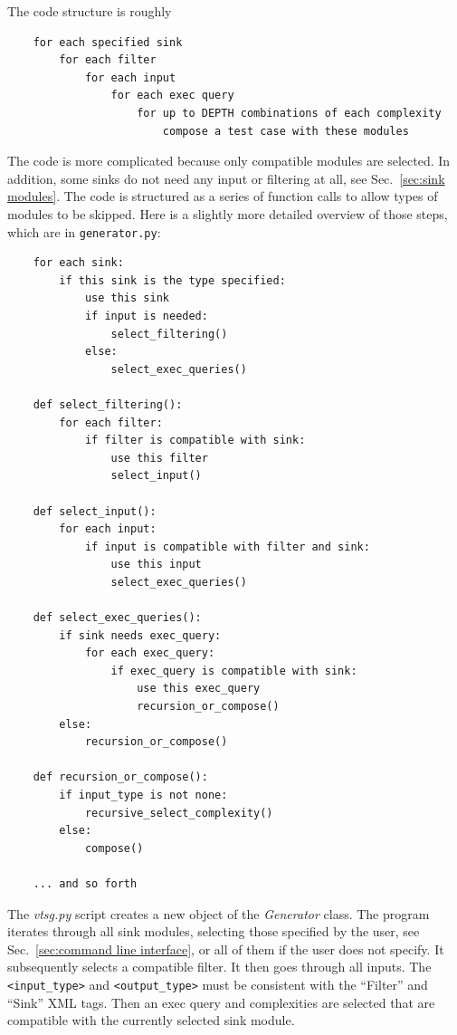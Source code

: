 \documentclass[12pt]{article}
\begin{document}
The code structure is roughly
\begin{verbatim}
    for each specified sink
        for each filter
            for each input
                for each exec query
                    for up to DEPTH combinations of each complexity
                        compose a test case with these modules
\end{verbatim}
The code is more complicated because only compatible modules are 
selected.
In addition, some sinks do not need any input or filtering at all,
see Sec.~\ref{sec:sink modules}.
The
code is structured as a series of function calls to allow types
of modules to be skipped.  Here is a slightly more detailed
overview of those steps, which are in \verb|generator.py|:
\begin{verbatim}
    for each sink:
        if this sink is the type specified:
            use this sink
            if input is needed:
                select_filtering()
            else:
                select_exec_queries()
    
    def select_filtering():
        for each filter:
            if filter is compatible with sink:
                use this filter
                select_input()
    
    def select_input():
        for each input:
            if input is compatible with filter and sink:
                use this input
                select_exec_queries()

    def select_exec_queries():
        if sink needs exec_query:
            for each exec_query:
                if exec_query is compatible with sink:
                    use this exec_query
                    recursion_or_compose()
        else:
            recursion_or_compose()

    def recursion_or_compose():
        if input_type is not none:
            recursive_select_complexity()
        else:
            compose()

    ... and so forth
\end{verbatim}

The \emph{vtsg.py} script creates a new object of the
\emph{Generator} class. 
The program iterates through all sink modules, selecting those
specified by the user, see
Sec.~\ref{sec:command line interface}, 
or all of them if the user does not specify. It subsequently
selects a compatible filter.  It then goes through all inputs.
The \verb|<input_type>| and \verb|<output_type>|
must be consistent with the ``Filter'' and ``Sink'' XML tags.
Then an exec query and complexities are selected
that are compatible with the currently selected sink module.
\end{document}
